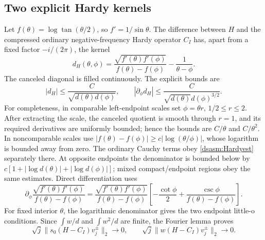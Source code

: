 \documentclass[11pt,letterpaper]{article}
\theoremstyle{remark}\newtheorem{remark}[theorem]{Remark}
\begin{document}
\subsection{Two explicit Hardy kernels}
Let $f(\theta)=\log\tan(\theta/2)$, so $f'=1/\sin\theta$.
The difference between $H$ and the compressed ordinary
negative-frequency Hardy operator $C_I$ has, apart from a fixed
factor $-i/(2\pi)$, the kernel
\[
 d_H(\theta,\phi)=
 \frac{\sqrt{f'(\theta)f'(\phi)}}{f(\theta)-f(\phi)}
                         -\frac1{\theta-\phi}.
\]
The canceled diagonal is filled continuously. The explicit bounds are
\begin{equation}\label{dsasm:Hardyest}
 |d_H|\le\frac C{\sqrt{d(\theta)d(\phi)}},\qquad
 |\partial_\phi d_H|\le\frac C{\sqrt{d(\theta)}d(\phi)^{3/2}}.
\end{equation}
For completeness, in comparable left-endpoint scales set $\phi=\theta r$,
$1/2\le r\le2$. After extracting the scale, the canceled quotient
is smooth through $r=1$, and its required derivatives are uniformly
bounded; hence the bounds are $C/\theta$ and $C/\theta^2$.
In noncomparable scales use
$|f(\theta)-f(\phi)|\ge c|\log(\theta/\phi)|$, whose logarithm
is bounded away from zero. The ordinary Cauchy terms obey
\eqref{dsasm:Hardyest} separately there. At opposite endpoints the denominator
is bounded below by
$c[1+|\log d(\theta)|+|\log d(\phi)|]$; mixed compact/endpoint
regions obey the same estimates. Direct differentiation uses
\[
 \partial_\phi\frac{\sqrt{f'(\theta)f'(\phi)}}{f(\theta)-f(\phi)}
 =\frac{\sqrt{f'(\theta)f'(\phi)}}{f(\theta)-f(\phi)}
       \left[-\frac{\cot\phi}{2}
                    +\frac{\csc\phi}{f(\theta)-f(\phi)}\right].
\]
For fixed interior $\theta$, the logarithmic denominator gives the
two endpoint little-o conditions. Since $\int w/d$ and
$\int w^2/d$ are finite, the Fourier lemma proves
\begin{equation}\label{dsasm:Hardywaves}
 \sqrt j\|s_0(H-C_I)v_j^\pm\|_2\to0,
 \qquad \sqrt j\|w(H-C_I)v_j^\pm\|_2\to0.
\end{equation}
\end{document}
